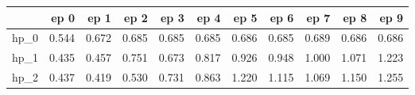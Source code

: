 \begin{tabular}{lrrrrrrrrrr}
\toprule
{} &   ep 0 &   ep 1 &   ep 2 &   ep 3 &   ep 4 &   ep 5 &   ep 6 &   ep 7 &   ep 8 &   ep 9 \\
\midrule
hp\_0 &  0.544 &  0.672 &  0.685 &  0.685 &  0.685 &  0.686 &  0.685 &  0.689 &  0.686 &  0.686 \\
hp\_1 &  0.435 &  0.457 &  0.751 &  0.673 &  0.817 &  0.926 &  0.948 &  1.000 &  1.071 &  1.223 \\
hp\_2 &  0.437 &  0.419 &  0.530 &  0.731 &  0.863 &  1.220 &  1.115 &  1.069 &  1.150 &  1.255 \\
\bottomrule
\end{tabular}
